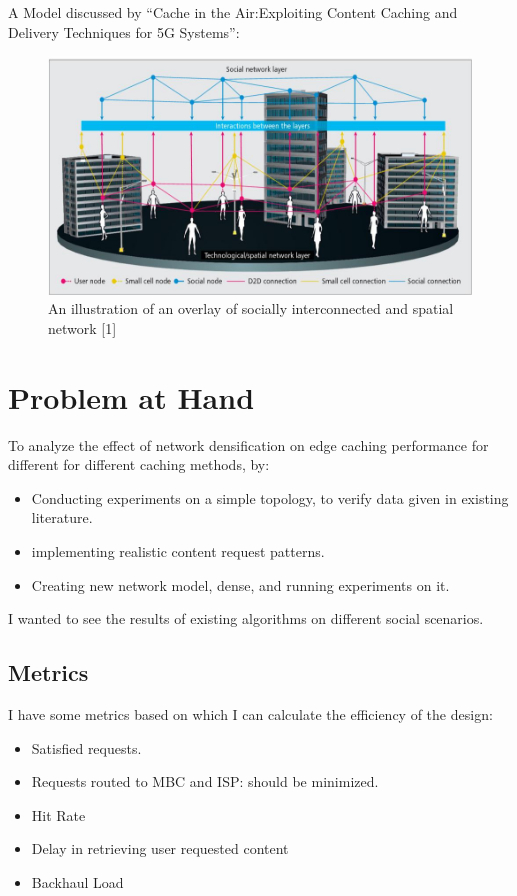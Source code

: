 \documentclass[]{article} %
\begin{document}
A Model discussed by “Cache in the Air:Exploiting Content Caching and Delivery Techniques for 5G Systems”:
\begin{figure}[!h]
    \centering
    \includegraphics[scale=0.45]{EdgeCaching.jpg}
    \caption{An illustration of an overlay of socially interconnected and spatial network [1]}
\end{figure}
\section*{Problem at Hand}

To analyze the effect of network densification on edge caching performance for different for different caching methods, by:
\begin{itemize}
    \item Conducting experiments on a simple topology, to verify data given in existing literature.
    \item implementing realistic content request patterns.
    \item Creating new network model, dense, and running experiments on it. 
\end{itemize}
I wanted to see the results of existing algorithms on different social scenarios. 
\subsection*{Metrics}
I have some metrics based on which I can calculate the efficiency of the design:
\begin{itemize}
    \item Satisfied requests.
\item Requests routed to MBC and ISP: should be minimized.
\item Hit Rate
\item  Delay in retrieving user requested content
\item Backhaul Load
\end{itemize}
\end{document}
